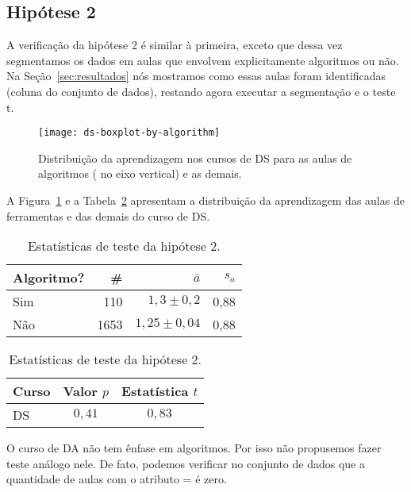 \subsection{Hipótese 2}
\label{sec:resultados-hipotese-2}

A verificação da hipótese 2 é similar à primeira, exceto que dessa vez segmentamos os dados em aulas que envolvem explicitamente algoritmos ou não.
Na Seção~\ref{sec:resultados} nós mostramos como essas aulas foram identificadas (coluna  do conjunto de dados), restando agora executar a segmentação e o teste t.

\begin{figure}
	\centering
	\texttt{[image: ds-boxplot-by-algorithm]}
	\caption{Distribuição da aprendizagem nos cursos de DS para as aulas de algoritmos ( no eixo vertical) e as demais.}
	\label{fig:dist-hipotese-2}
\end{figure}

A Figura~\ref{fig:dist-hipotese-2} e a Tabela~\ref{tab:dist-hipotese-2} apresentam a distribuição da aprendizagem das aulas de ferramentas e das demais do curso de DS.

\begin{table}
	\centering
	\begin{minipage}[t]{0.46\textwidth}
		\caption{Tamanho da amostra (\#), média e desvio-padrão da aprendizagem em DS.}
		\label{tab:dist-hipotese-2}
		\begin{tabular}{lrrr}
			\toprule
			Algoritmo? & \# & $\bar{a}$ & $s_a$ \\
			\midrule
			Sim &  110 &  $1,3\pm 0,2$ & 0,88 \\
			Não & 1653 & $1,25\pm 0,04$ & 0,88 \\
			\bottomrule
		\end{tabular}
	\end{minipage}\hfill
	\begin{minipage}[t]{0.46\textwidth}
		\caption{Estatísticas de teste da hipótese 2.}
		\begin{tabular}{lcc}
		\toprule
		Curso & Valor $p$   & Estatística $t$ \\
		\midrule
		DS    & $0,41$      & $0,83$ \\ 
		\bottomrule
		\end{tabular}
	\end{minipage}
\end{table}

O curso de DA não tem ênfase em algoritmos.
Por isso não propusemos fazer teste análogo nele.
De fato, podemos verificar no conjunto de dados que a quantidade de aulas com o atributo  =  é zero.

